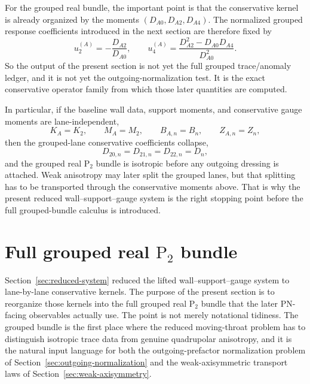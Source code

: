 \documentclass[11pt]{article}
\theoremstyle{definition}
\newcommand{\Ptwo}{\ensuremath{\mathrm{P}_2}}
\begin{document}
For the grouped real bundle, the important point is that the conservative kernel is already organized by the moments $(D_{A0},D_{A2},D_{A4})$. The normalized grouped response coefficients introduced in the next section are therefore fixed by
\begin{equation}
u_2^{(A)}=-\frac{D_{A2}}{D_{A0}},
\qquad
u_4^{(A)}=\frac{D_{A2}^2-D_{A0}D_{A4}}{D_{A0}^2}.
\label{eq:reduced-u-moments-preview}
\end{equation}
So the output of the present section is not yet the full grouped trace/anomaly ledger, and it is not yet the outgoing-normalization test. It is the exact conservative operator family from which those later quantities are computed.

In particular, if the baseline wall data, support moments, and conservative gauge moments are lane-independent,
\[
K_A=K_2,
\qquad
M_A=M_2,
\qquad
B_{A,n}=B_n,
\qquad
Z_{A,n}=Z_n,
\]
then the grouped-lane conservative coefficients collapse,
\[
D_{20,n}=D_{21,n}=D_{22,n}=D_n,
\]
and the grouped real $\Ptwo$ bundle is isotropic before any outgoing dressing is attached. Weak anisotropy may later split the grouped lanes, but that splitting has to be transported through the conservative moments above. That is why the present reduced wall--support--gauge system is the right stopping point before the full grouped-bundle calculus is introduced.

\section{Full grouped real \texorpdfstring{$\Ptwo$}{Ptwo} bundle}
\label{sec:grouped-bundle}

Section~\ref{sec:reduced-system} reduced the lifted wall--support--gauge system to lane-by-lane conservative kernels. The purpose of the present section is to reorganize those kernels into the full grouped real $\Ptwo$ bundle that the later PN-facing observables actually use. The point is not merely notational tidiness. The grouped bundle is the first place where the reduced moving-throat problem has to distinguish isotropic trace data from genuine quadrupolar anisotropy, and it is the natural input language for both the outgoing-prefactor normalization problem of Section~\ref{sec:outgoing-normalization} and the weak-axisymmetric transport laws of Section~\ref{sec:weak-axisymmetry}.
\end{document}
